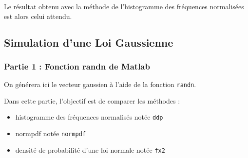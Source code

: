 \documentclass[a4paper,oneside]{article}
\begin{document}
Le résultat obtenu avec la méthode de l'histogramme des fréquences normalisées est alors celui attendu. 

\newpage
\subsection{Simulation d'une Loi Gaussienne}

\subsubsection{Partie 1 : Fonction randn de Matlab}

On générera ici le vecteur gaussien à l'aide de la fonction \verb?randn?.

Dans cette partie, l'objectif est de comparer les méthodes :
\begin{itemize}
	\item histogramme des fréquences normalisés notée \verb?ddp?
	\item normpdf notée \verb?normpdf?
	\item densité de probabilité d'une loi normale notée \verb?fx2?
\end{itemize}
\end{document}
